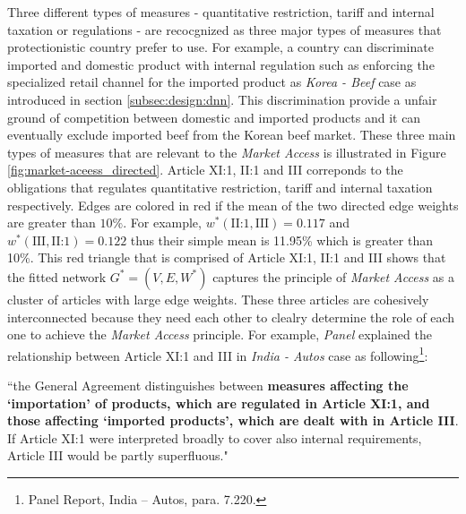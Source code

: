 Three different types of measures - quantitative restriction, tariff and internal taxation or regulations - are recocgnized as 
three major types of measures that protectionistic country prefer to use. For example, a country can
discriminate imported and domestic product with internal regulation such as enforcing the specialized retail channel for the imported product as \textit{Korea - Beef} case as introduced in section \ref{subsec:design:dnn}.
This discrimination provide a unfair ground of competition between domestic and imported products and it can eventually exclude imported beef from the Korean beef market.
These three main types of measures that are relevant to the \textit{Market Access} is illustrated in Figure \ref{fig:market-aceess_directed}.
Article XI:1, II:1 and III correponds to the obligations that regulates quantitative restriction, tariff and internal taxation respectively.
Edges are colored in red if the mean of the two directed edge weights are greater than $10\%$. For example, $w^*(\text{II:1}, \text{III}) = 0.117$ and $w^*(\text{III}, \text{II:1}) = 0.122$ thus their simple mean is 11.95\% which is greater than 10\%.
This red triangle that is comprised of Article XI:1, II:1 and III shows that the fitted network $G^* = (V, E, W^*)$ captures the principle of \textit{Market Access} as a cluster of articles with large edge weights. 
These three articles are cohesively interconnected because they need each other to clealry determine the role of each one to achieve the \textit{Market Access} principle.
For example, \textit{Panel} explained the relationship between Article XI:1 and III in \textit{India - Autos} case as following\footnote{Panel Report, India – Autos, para. 7.220.}:

\begin{displayquote}[][]
``the General Agreement distinguishes between \textbf{measures affecting the `importation' of products,
which are regulated in Article XI:1, and those affecting `imported products', which are dealt with in
Article III}. If Article XI:1 were interpreted broadly to cover also internal requirements, Article III
would be partly superfluous."
\end{displayquote}




